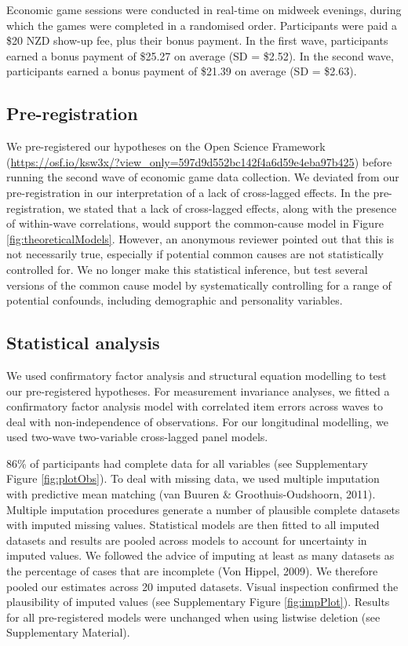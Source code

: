 \documentclass[
  man,floatsintext]{apa6}
\begin{document}
Economic game sessions were conducted in real-time on midweek evenings, during
which the games were completed in a randomised order. Participants were paid a
\$20 NZD show-up fee, plus their bonus payment. In the first wave, participants
earned a bonus payment of \$25.27 on average (SD = \$2.52). In the second wave,
participants earned a bonus payment of
\$21.39 on average (SD =
\$2.63).

\hypertarget{pre-registration}{%
\subsection{Pre-registration}\label{pre-registration}}

We pre-registered our hypotheses on the Open Science Framework
(\url{https://osf.io/ksw3x/?view_only=597d9d552bc142f4a6d59e4eba97b425}) before
running the second wave of economic game data collection. We deviated from our
pre-registration in our interpretation of a lack of cross-lagged effects. In the
pre-registration, we stated that a lack of cross-lagged effects, along with the
presence of within-wave correlations, would support the common-cause model in
Figure \ref{fig:theoreticalModels}. However, an anonymous reviewer pointed out
that this is not necessarily true, especially if potential common causes are not
statistically controlled for. We no longer make this statistical inference, but
test several versions of the common cause model by systematically controlling
for a range of potential confounds, including demographic and personality
variables.

\hypertarget{statistical-analysis}{%
\subsection{Statistical analysis}\label{statistical-analysis}}

We used confirmatory factor analysis and structural equation modelling to test
our pre-registered hypotheses. For measurement invariance analyses, we fitted a
confirmatory factor analysis model with correlated item errors across waves to
deal with non-independence of observations. For our longitudinal modelling, we
used two-wave two-variable cross-lagged panel models.

86\% of participants had complete data
for all variables (see Supplementary Figure \ref{fig:plotObs}). To deal with
missing data, we used multiple imputation with predictive mean matching
(van Buuren \& Groothuis-Oudshoorn, 2011). Multiple imputation procedures generate a number of plausible
complete datasets with imputed missing values. Statistical models are then
fitted to all imputed datasets and results are pooled across models to account
for uncertainty in imputed values. We followed the advice of imputing at least
as many datasets as the percentage of cases that are incomplete
(Von Hippel, 2009). We therefore pooled our estimates across 20 imputed datasets.
Visual inspection confirmed the plausibility of imputed values (see
Supplementary Figure \ref{fig:impPlot}). Results for all pre-registered models
were unchanged when using listwise deletion (see Supplementary Material).
\end{document}
